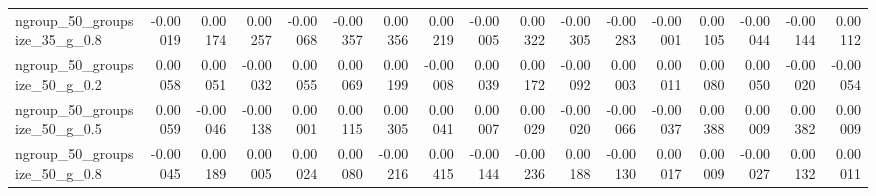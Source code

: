 \documentclass[10pt, a4paper, titlepage]{article}
\begin{document}
\begin{landscape}
\begin{table}[]
{\begin{tabular}{l|rrrr|rrrr|rrrr|rrrr}
ngroup\_50\_groupsize\_35\_g\_0.8 & -0.00019                          & 0.00174                            & 0.00257                            & -0.00068                                & -0.00357                          & 0.00356                            & 0.00219                            & -0.00005                                & 0.00322                           & -0.00305                           & -0.00283                           & -0.00001                                & 0.00105                           & -0.00044                           & -0.00144                           & 0.00112                                \\
ngroup\_50\_groupsize\_50\_g\_0.2 & 0.00058                           & 0.00051                            & -0.00032                           & 0.00055                                 & 0.00069                           & 0.00199                            & -0.00008                           & 0.00039                                 & 0.00172                           & -0.00092                           & 0.00003                            & 0.00011                                 & 0.00080                           & 0.00050                            & -0.00020                           & -0.00054                               \\
ngroup\_50\_groupsize\_50\_g\_0.5 & 0.00059                           & -0.00046                           & -0.00138                           & 0.00001                                 & 0.00115                           & 0.00305                            & 0.00041                            & 0.00007                                 & 0.00029                           & -0.00020                           & -0.00066                           & -0.00037                                & 0.00388                           & 0.00009                            & 0.00382                            & 0.00009                                \\
ngroup\_50\_groupsize\_50\_g\_0.8 & -0.00045                          & 0.00189                            & 0.00005                            & 0.00024                                 & 0.00080                           & -0.00216                           & 0.00415                            & -0.00144                                & -0.00236                          & 0.00188                            & -0.00130                           & 0.00017                                 & 0.00009                           & -0.00027                           & 0.00132                            & 0.00011                                \\

\end{tabular}}
\end{table}
\end{landscape}
\end{document}
